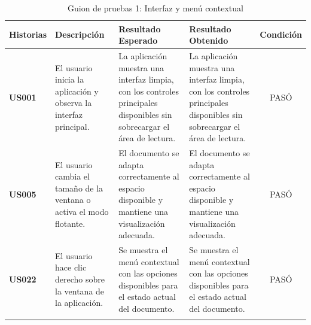\begin{longtable}{ | p{2cm} | p{3cm} | p{4cm} | p{4cm} | c |}
      \hline
      \textbf{Historias} & \textbf{Descripción} & \textbf{Resultado Esperado} & \textbf{Resultado Obtenido} & \textbf{Condición}\\
      \hline
      \textbf{US001} & El usuario inicia la aplicación y observa la interfaz principal. & La aplicación muestra una interfaz limpia, con los controles principales disponibles sin sobrecargar el área de lectura. & La aplicación muestra una interfaz limpia, con los controles principales disponibles sin sobrecargar el área de lectura. & PASÓ \\
      \hline
    
       \textbf{US005} & El usuario cambia el tamaño de la ventana o activa el modo flotante. & El documento se adapta correctamente al espacio disponible y mantiene una visualización adecuada. & El documento se adapta correctamente al espacio disponible y mantiene una visualización adecuada. & PASÓ \\
       \hline
    
       \textbf{US022} &
       El usuario hace clic derecho sobre la ventana de la aplicación. & Se muestra el menú contextual con las opciones disponibles para el estado actual del documento. & Se muestra el menú contextual con las opciones disponibles para el estado actual del documento. & PASÓ \\
       \hline
    
      \caption{Guion de pruebas 1: Interfaz y menú contextual}
      \label{TestScript1}
\end{longtable}

